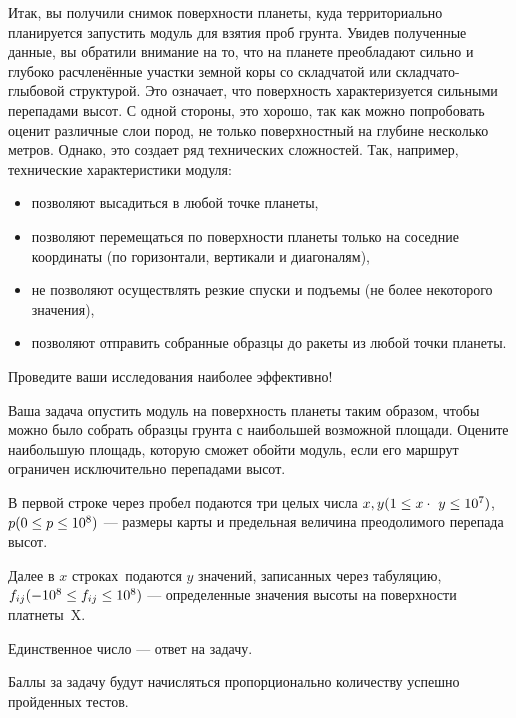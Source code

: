 
Итак, вы получили снимок поверхности планеты, куда территориально планируется запустить модуль для взятия проб грунта. Увидев полученные данные, вы обратили внимание на то, что на планете преобладают сильно и глубоко расчленённые участки земной коры со складчатой или складчато-глыбовой структурой. Это означает, что поверхность характеризуется сильными перепадами высот. С одной стороны, это хорошо, так как можно попробовать оценит различные слои пород, не только поверхностный на глубине несколько метров. Однако, это создает ряд технических сложностей. Так, например, технические характеристики модуля:

\begin{itemize}
    \item позволяют высадиться в любой точке планеты,
    \item позволяют перемещаться по поверхности планеты только на соседние координаты (по горизонтали, вертикали и диагоналям),
    \item не позволяют осуществлять резкие спуски и подъемы (не более некоторого значения),
    \item позволяют отправить собранные образцы до ракеты из любой точки планеты.
\end{itemize}


Проведите ваши исследования наиболее эффективно! 

Ваша задача опустить модуль на поверхность планеты таким образом, чтобы можно было собрать образцы грунта с наибольшей возможной площади. Оцените наибольшую площадь, которую сможет обойти модуль, если его маршрут ограничен исключительно перепадами высот.


В первой строке через пробел подаются три целых числа $x, y \space (1\leq x \cdot y \leq 10^7)$, $p\space (0 \leq p \leq 10^8)$ — размеры карты и предельная величина преодолимого перепада высот.

Далее в $x$ строках подаются $y$ значений, записанных через табуляцию, \linebreak $f_{ij}\space(-10^8 \leq f_{ij} \leq 10^8)$ — определенные значения высоты на поверхности платнеты~X.

\outputfmtSection

Единственное число — ответ на задачу.

\markSection

Баллы за задачу будут начисляться пропорционально количеству успешно пройденных тестов.

